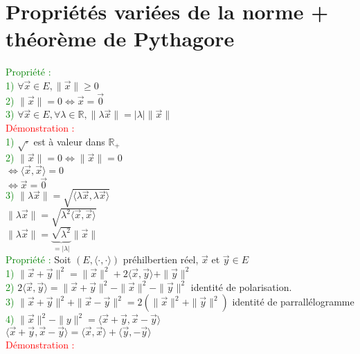 \documentclass{article}
\begin{document}
\section{Propriétés variées de la norme + théorème de Pythagore}
\textcolor{green}{Propriété :} \\
\textcolor{green}{1)} $\forall \vec x \in E, \| \vec x \| \geq 0$ \\
\textcolor{green}{2)} $\| \vec x \| =0 \Leftrightarrow \vec x = \vec 0$ \\
\textcolor{green}{3)} $\forall \vec x \in E, \forall \lambda \in \mathbb R, \| \lambda \vec x \| = |\lambda| \| \vec x \|$ \\
\textcolor{red}{Démonstration :} \\
\textcolor{green}{1)} $\sqrt{\cdot }$ est à valeur dans $\mathbb R_+$ \\
\textcolor{green}{2)} $\|\vec x \| =0 \Leftrightarrow \| \vec x \|=0$ \\
$\Leftrightarrow \langle \vec x, \vec x \rangle=0$ \\
$\Leftrightarrow \vec x =  \vec 0$ \\
\textcolor{green}{3)} $\| \lambda \vec x \| = \sqrt{\langle \lambda \vec x, \lambda \vec x \rangle}$ \\
$\| \lambda \vec x \|= \sqrt{\lambda^2\langle \vec x, \vec x \rangle}$ \\
$\| \lambda \vec x \|= \underbrace{\sqrt{\lambda^2}}_{= | \lambda |} \| \vec x \|$ \\
\textcolor{green}{Propriété :} Soit $(E, \langle \cdot,\cdot \rangle)$ préhilbertien réel, $\vec x$ et $\vec y \in E$ \\
\textcolor{green}{1)} $\| \vec x +\vec y \|^2= \| \vec x \|^2 + 2 \langle \vec x , \vec y \rangle + \| \vec y \|^2$ \\
\textcolor{green}{2)} $2 \langle \vec x , \vec y \rangle= \| \vec x + \vec y \|^2- \| \vec x \|^2- \| \vec y \|^2$ identité de polarisation. \\
\textcolor{green}{3)} $\| \vec x+ \vec y \|^2 + \| \vec x - \vec y \|^2= 2 (\|\vec x \|^2 + \| \vec y \|^2)$ identité de parrallélogramme \\
\textcolor{green}{4)} $\| \vec x \|^2 - \| y \|^2= \langle \vec x + \vec y, \vec x - \vec y \rangle$ \\
$\langle \vec x + \vec y , \vec  x - \vec y \rangle = \langle \vec x, \vec x \rangle + \langle \vec y, - \vec y \rangle $ \\
\textcolor{red}{Démonstration :} \\
\end{document}
